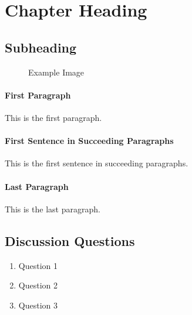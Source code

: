 \documentclass{article}
\begin{document}
\section{Chapter Heading}

\subsection{Subheading}


\begin{figure}[htbp]
    \centering
    \caption{Example Image}
    \label{fig:example}
\end{figure}

\paragraph{First Paragraph} This is the first paragraph.

\paragraph{First Sentence in Succeeding Paragraphs} This is the first sentence in succeeding paragraphs.

\paragraph{Last Paragraph} This is the last paragraph.

\subsection*{Discussion Questions}
\begin{enumerate}\vskip 10mm
    \item Question 1
    \item Question 2
    \item Question 3
\end{enumerate}
\end{document}
